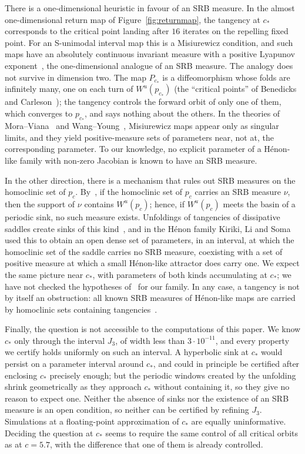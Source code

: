 \documentclass[11pt]{amsart}
\theoremstyle{definition}
\theoremstyle{remark}
\newcommand{\Wu}{W^u}
\newcommand{\cs}{c_*}
\begin{document}
There is a one-dimensional heuristic in favour of an SRB measure. In the almost one-dimensional return map of
Figure~\ref{fig:returnmap}, the tangency at $\cs$ corresponds to the critical point landing after $16$ iterates
on the repelling fixed point. For an S-unimodal interval map this is a Misiurewicz condition, and such maps have
an absolutely continuous invariant measure with a positive Lyapunov exponent~\cite{Mis81}, the one-dimensional
analogue of an SRB measure. The analogy does not survive in dimension two. The map $P_{\cs}$ is a diffeomorphism
whose folds are infinitely many, one on each turn of $\Wu(p_{\cs})$ (the ``critical points'' of Benedicks and
Carleson~\cite{BC91}); the tangency controls the forward orbit of only one of them, which converges to
$p_{\cs}$, and says nothing about the others. In the theories of Mora--Viana~\cite{MV93} and Wang--Young~\cite{WY01}, Misiurewicz maps
appear only as singular limits, and they yield positive-measure sets of parameters near, not at, the
corresponding parameter. To our knowledge, no explicit parameter of a H\'enon-like family with non-zero
Jacobian is known to have an SRB measure.

In the other direction, there is a mechanism that rules out SRB measures on the homoclinic set of $p_c$.
By~\cite[Proposition~2.1]{New04}, if the homoclinic set of $p_c$ carries an SRB measure $\nu$, then the support
of $\nu$ contains $\Wu(p_c)$; hence, if $\Wu(p_c)$ meets the basin of a periodic sink, no such measure exists.
Unfoldings of tangencies of dissipative saddles create sinks of this kind~\cite[Lemma~2.2]{New04}, and in the
H\'enon family Kiriki, Li and Soma~\cite{KLS10} used this to obtain an open dense set of parameters, in an
interval, at which the homoclinic set of the saddle carries no SRB measure, coexisting with a set of positive
measure at which a small H\'enon-like attractor does carry one. We expect the same picture near $\cs$, with
parameters of both kinds accumulating at $\cs$; we have not checked the hypotheses of~\cite{KLS10} for our
family. In any case, a tangency is not by itself an obstruction: all known SRB measures of H\'enon-like maps
are carried by homoclinic sets containing tangencies~\cite{New04}.

Finally, the question is not accessible to the computations of this paper. We know $\cs$ only through the
interval $J_3$, of width less than $3\cdot10^{-11}$, and every property we certify holds uniformly on such an
interval. A hyperbolic sink at $\cs$ would persist on a parameter interval around $\cs$, and could in principle
be certified after enclosing $\cs$ precisely enough; but the periodic windows created by the unfolding shrink
geometrically as they approach $\cs$ without containing it, so they give no reason to expect one. Neither the
absence of sinks nor the existence of an SRB measure is an open condition, so neither can be certified by
refining $J_3$. Simulations at a floating-point approximation of $\cs$
are equally uninformative. Deciding the question at $\cs$ seems to require the same control of all critical
orbits as at $c=5.7$, with the difference that one of them is already controlled.
\end{document}
